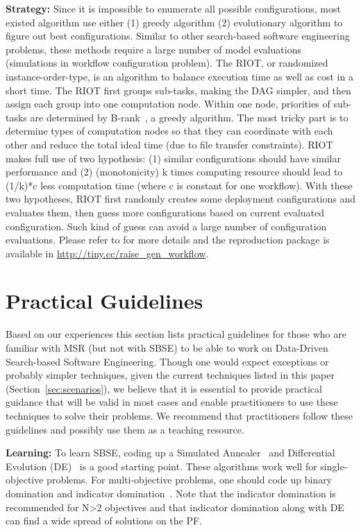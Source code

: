 \documentclass[sigconf]{acmart}
\begin{document}
\noindent\textbf{Strategy:} 
Since it is impossible to enumerate all possible configurations, most existed algorithm use either (1) greedy algorithm (2) evolutionary algorithm to figure out best configurations.
Similar to other search-based software engineering problems,
these methods require a large number of model evaluations (simulations in workflow configuration problem).
The RIOT, or randomized instance-order-type, is an algorithm to balance execution time as well as cost
in a short time.
The RIOT first groups sub-tasks, making the DAG simpler, and then
assign each group into one computation node. Within one node,
priorities of sub-tasks are determined by
B-rank~\cite{topcuoglu2002performance}, a greedy algorithm. 
The most tricky part is to determine types of computation nodes so that they can coordinate with each other and reduce the total ideal time (due to file transfer constraints).
RIOT makes full use of two hypothesis: (1) similar configurations should have similar performance and (2) (monotonicity) k times computing resource should lead to (1/k)*c less computation time (where c is constant for one workflow).
With these two hypotheses,
RIOT first randomly creates some deployment configurations and evaluates them, then guess more configurations based on current evaluated configuration. Such kind of guess can avoid a large number of configuration evaluations. Please refer to \cite{chen2017riot} for more details and the reproduction package is available in \url{http://tiny.cc/raise_gen_workflow}.


\section{Practical Guidelines} \label{sec:guide}

Based on our experiences this section lists practical guidelines for those who are familiar with MSR (but not with SBSE) to be able to work on Data-Driven Search-based Software Engineering. 
Though one would expect exceptions or probably simpler techniques, given the current techniques listed in this paper (Section~\ref{sec:scenarios}), we believe that it is essential to provide practical guidance that will be valid in most cases and enable practitioners to use these techniques to solve their problems. 
We recommend that practitioners follow these guidelines and possibly use them as a teaching resource.

 
\noindent\textbf{Learning: } To learn SBSE, coding up a Simulated Annealer~\cite{van1987simulated} and Differential Evolution (DE)~\cite{storn97} is a good starting point.  These algorithms work well for single-objective problems. For multi-objective problems, one should code up binary domination and indicator domination~\cite{zitzler2001spea2}. Note that the indicator domination is recommended for N>2 objectives and that indicator domination along with DE can find a wide spread of solutions on the PF. 
\end{document}
